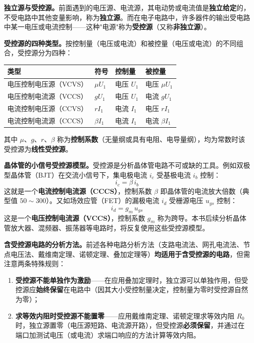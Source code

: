 \documentclass[12pt,UTF8]{ctexbook}
\begin{document}
\textbf{独立源与受控源。}前面遇到的电压源、电流源，其电动势或电流值是\textbf{独立给定}的，不受电路中其他变量影响，称为\textbf{独立源}。而在电子电路中，许多器件的输出受电路中某一电压或电流控制——这种"电源"称为\textbf{受控源}（又称\textbf{非独立源}）。

\textbf{受控源的四种类型。}按控制量（电压或电流）和被控量（电压或电流）的不同组合，受控源分为四种：

\begin{center}
\begin{tabular}{llll}
\hline
\textbf{类型} & \textbf{符号} & \textbf{控制量} & \textbf{被控量} \\
\hline
电压控制电压源（VCVS） & $\mu U_1$ & 电压 $U_1$ & 电压 $\mu U_1$ \\
电压控制电流源（VCCS） & $g U_1$ & 电压 $U_1$ & 电流 $g U_1$ \\
电流控制电压源（CCVS） & $r I_1$ & 电流 $I_1$ & 电压 $r I_1$ \\
电流控制电流源（CCCS） & $\beta I_1$ & 电流 $I_1$ & 电流 $\beta I_1$ \\
\hline
\end{tabular}
\end{center}

其中 $\mu$、$g$、$r$、$\beta$ 称为\textbf{控制系数}（无量纲或具有电阻、电导量纲），均为常数时该受控源为\textbf{线性受控源}。


\textbf{晶体管的小信号受控源模型。}受控源是分析晶体管电路不可或缺的工具。例如双极型晶体管（BJT）在交流小信号下，集电极电流 $i_c$ 受基极电流 $i_b$ 控制：
\[
i_c = \beta \, i_b
\]
这就是一个\textbf{电流控制电流源（CCCS）}，控制系数 $\beta$ 即晶体管的电流放大倍数（典型值 $50\sim300$）。又如场效应管（FET）的漏极电流 $i_d$ 受栅源电压 $u_{gs}$ 控制：
\[
i_d = g_m \, u_{gs}
\]
这是一个\textbf{电压控制电流源（VCCS）}，控制系数 $g_m$ 称为跨导。本书后续分析晶体管放大器、混频器、振荡器等电路时，将反复使用这些受控源模型。

\textbf{含受控源电路的分析方法。}前述各种电路分析方法（支路电流法、网孔电流法、节点电压法、戴维南定理、诺顿定理、叠加定理等）\textbf{均适用于含受控源的电路}，但需注意两条特殊规则：
\begin{enumerate}
  \item \textbf{受控源不能单独作为激励}——在应用叠加定理时，独立源可以单独作用，但受控源应\textbf{始终保留}在电路中（因其大小受控制量决定，控制量为零时受控源自然为零）；
  \item \textbf{求等效内阻时受控源不能置零}——应用戴维南定理、诺顿定理求等效内阻 $R_0$ 时，独立源置零（电压源短路、电流源开路），但受控源\textbf{必须保留}，并通过在端口加测试电压（或电流）求端口响应的方法计算等效内阻。
\end{enumerate}
\end{document}
